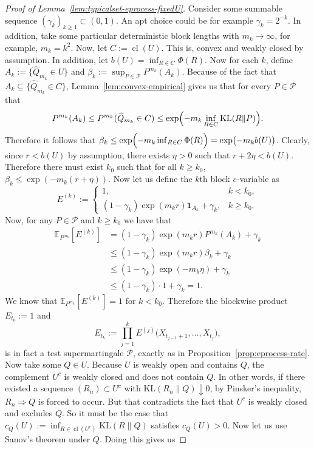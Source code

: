\documentclass[11pt]{article}
\newcommand{\KL}{\mathrm{KL}}
\newcommand{\E}{\mathbb{E}}
\newcommand{\Pcal}{\mathcal{P}}
\newcommand{\one}{\mathbf{1}}
\DeclareMathOperator{\cl}{cl}
\theoremstyle{definition}
\theoremstyle{definition}
\begin{document}
\begin{proof}[Proof of Lemma~\ref{lem:typicalset-eprocess-fixedU}]
Consider some summable sequence $(\gamma_k)_{k\ge 1}\subset(0,1)$. An apt choice could be for example $\gamma_k=2^{-k}$. In addition, take some particular deterministic block lengths with $m_k\to\infty$, for example, $m_k=k^2$. Now, let $C:=\cl(U)$. This is, convex and weakly closed by assumption. In addition, let $b(U)=\inf_{R\in C}\Phi(R)$. Now for each $k$, define $A_k:=\{\widehat Q_{m_k}\in U\}$ and $\beta_k:=\sup_{P\in\Pcal}P^{m_k}(A_k)$. Because of the fact that $A_k\subseteq\{\widehat Q_{m_k}\in C\}$, Lemma~\ref{lem:convex-empirical} gives us that for every $P\in\Pcal$ that
\[
P^{m_k}(A_k)\le P^{m_k}(\widehat Q_{m_k}\in C) \le \exp\Bigl(-m_k\inf_{R\in C}\KL(R\|P)\Bigr).
\]
Therefore it follows that $\beta_k\le \exp\Bigl(-m_k\inf_{R\in C}\Phi(R)\Bigr)=\exp\bigl(-m_k b(U)\bigr)$.
Clearly, since $r<b(U)$ by assumption, there exists $\eta>0$ such that $r+2\eta<b(U)$. Therefore there must exist $k_0$ such that for all $k\ge k_0$, $\beta_k\le \exp(-m_k(r+\eta))$. Now let us define the $k$th block $e$-variable as
\[
E^{(k)}:=
\begin{cases}
1, & k<k_0,\\[0.4em]
(1-\gamma_k)\exp(m_k r)\one_{A_k}+\gamma_k, & k\ge k_0.
\end{cases}
\]
Now, for any $P\in\Pcal$ and $k\ge k_0$ we have that
\begin{align*}
\E_{P^{m_k}}[E^{(k)}]
&=(1-\gamma_k)\exp(m_k r)P^{m_k}(A_k)+\gamma_k\\
&\le (1-\gamma_k)\exp(m_k r)\beta_k+\gamma_k\\
&\le (1-\gamma_k)\exp(-m_k\eta)+\gamma_k\\
&\le (1-\gamma_k)\cdot 1+\gamma_k=1.
\end{align*}
We know that $\E_{P^{m_k}}[E^{(k)}]=1$ for $k<k_0$. Therefore the blockwise product $E_{t_0}:=1$ and
\[
E_{t_k}:=\prod_{j=1}^k E^{(j)}\bigl(X_{t_{j-1}+1},\dots,X_{t_j}\bigr),
\]
is in fact a test supermartingale $\Pcal$, exactly as in Proposition~\ref{prop:eprocess-rate}. Now take some $Q\in U$. Because $U$ is weakly open and contains $Q$, the complement $U^c$ is weakly closed and does not contain $Q$. In other words, if there existed a sequence $(R_n)\subset U^c$ with $\KL(R_n\|Q)\downarrow 0$, by Pinsker's inequality, $R_n\Rightarrow Q$ is forced to occur. But that contradicts the fact that $U^c$ is weakly closed and excludes $Q$. So it must be the case that $c_Q(U):=\inf_{R\in\cl(U^c)}\KL(R\|Q)$ satisfies $c_Q(U)>0$. Now let us use Sanov's theorem under $Q$. Doing this gives us

\end{proof}
\end{document}
